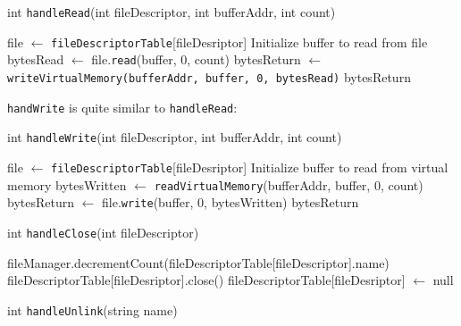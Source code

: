 \documentclass{article}
\begin{document}
\begin{spacing}{1.1}
\begin{algorithm}[htbp]
  \caption{int \texttt{handleRead}(int fileDescriptor, int bufferAddr, int count)}
\begin{algorithmic}[1]
  \EndIf
  \State file $\leftarrow$ \texttt{fileDescriptorTable}[fileDesriptor]
  \EndIf
  \State Initialize buffer to read from file
  \State bytesRead $\leftarrow$ file.\texttt{read}(buffer, 0, count)
  \Else
    \State bytesReturn $\leftarrow$ \texttt{writeVirtualMemory(bufferAddr, buffer, 0, bytesRead)}
    \Return bytesReturn
  \EndIf
\end{algorithmic}
\end{algorithm}

\texttt{handWrite} is quite similar to \texttt{handleRead}:

\begin{algorithm}[htbp]
  \caption{int \texttt{handleWrite}(int fileDescriptor, int bufferAddr, int count)}
\begin{algorithmic}[1]
  \EndIf
  \State file $\leftarrow$ \texttt{fileDescriptorTable}[fileDesriptor]
  \EndIf
  \State Initialize buffer to read from virtual memory
  \State bytesWritten $\leftarrow$ \texttt{readVirtualMemory}(bufferAddr, buffer, 0, count)
  \EndIf
  \State bytesReturn $\leftarrow$ file.\texttt{write}(buffer, 0, bytesWritten)
  \EndIf
  \Return bytesReturn
\end{algorithmic}
\end{algorithm}

\begin{algorithm}[htbp]
  \caption{int \texttt{handleClose}(int fileDescriptor)}
\begin{algorithmic}[1]
  \EndIf
  \State fileManager.decrementCount(fileDescriptorTable[fileDescriptor].name)
  \State fileDescriptorTable[fileDesriptor].close()
  \State fileDescriptorTable[fileDesriptor] $\leftarrow$ null
\end{algorithmic}
\end{algorithm}

\begin{algorithm}[htbp]
  \caption{int \texttt{handleUnlink}(string name)}
\begin{algorithmic}[1]
  \EndIf
\end{algorithmic}
\end{algorithm}




\end{spacing}
\end{document}
